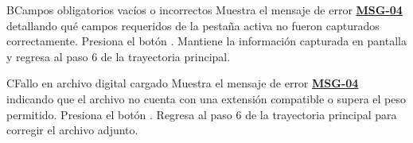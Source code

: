 \begin{UCtrayectoriaA}{B}{Campos obligatorios vacíos o incorrectos}
	\UCpaso Muestra el mensaje de error \hyperlink{mMSG04}{\bf MSG-04} detallando qué campos requeridos de la pestaña activa no fueron capturados correctamente.
	\UCpaso[\UCactor] Presiona el botón .
	\UCpaso Mantiene la información capturada en pantalla y regresa al paso 6 de la trayectoria principal.
\end{UCtrayectoriaA}

\begin{UCtrayectoriaA}{C}{Fallo en archivo digital cargado}
	\UCpaso Muestra el mensaje de error \hyperlink{mMSG04}{\bf MSG-04} indicando que el archivo no cuenta con una extensión compatible o supera el peso permitido.
	\UCpaso[\UCactor] Presiona el botón .
	\UCpaso Regresa al paso 6 de la trayectoria principal para corregir el archivo adjunto.
\end{UCtrayectoriaA}
